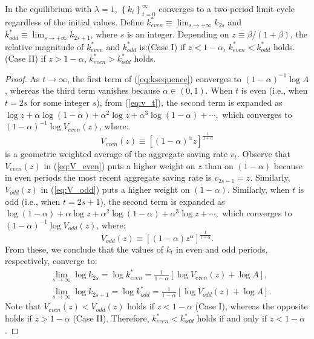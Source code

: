 \documentclass{MBE}%
\begin{document}
{\begin{flLem}
In the equilibrium with $\lambda=1$, $\left\{ k_{t}\right\} _{t=0}^{\infty}$ converges to a
two-period limit cycle regardless of the initial values. Define $k_{even}^{\ast}\equiv\lim
_{s\rightarrow+\infty}k_{2s}$ and $k_{odd}^{\ast}\equiv\lim_{s\rightarrow +\infty}k_{2s+1}$, where
$s$ is an integer. Depending on $z\equiv \beta/(1+\beta)$, the relative magnitude of
$k_{even}^{\ast}$ and
$k_{odd}^{\ast}$ is:\newline\textrm{(Case I)} if $z<1-\alpha$, $k_{even}%
^{\ast}<k_{odd}^{\ast}$ holds.\newline\textrm{(Case II)} if $z>1-\alpha$,
$k_{even}^{\ast}>k_{odd}^{\ast}$ holds. {\label{fn:caseII}}
\end{flLem}

\begin{proof}
As $t\rightarrow\infty$, the first term of (\ref{eq:ksequence}) converges to
$(1-\alpha)^{-1}\log A$, whereas the third term vanishes because $\alpha
\in(0,1)$. When $t$ is even (i.e., when $t=2s$ for some integer $s$), from
(\ref{eq:v_t}), the second term is expanded as $\log z+\alpha\log
(1-\alpha)+\alpha^{2}\log z+\alpha^{3}\log(1-\alpha)+\cdots,$ which converges
to $(1-\alpha)^{-1}\log V_{even}(z)$, where:
\begin{equation}
V_{even}(z)\equiv\left[  \left(  1-\alpha\right)  ^{\alpha}z\right]
^{\frac{1}{1+\alpha}} \label{eq:V_even}%
\end{equation}
is a geometric weighted average of the aggregate saving rate $v_{t}%
$. {Observe that $V_{even}(z)$ in (\ref{eq:V_even}) puts a higher weight on $z$ than on
$(1-\alpha)$ because in even periods the most recent aggregate saving rate is $v_{2s-1}=z$.
Similarly, $V_{odd}(z)$ in (\ref{eq:V_odd}) puts a higher weight on $(1-\alpha)$.} Similarly, when
$t$ is odd (i.e., when $t=2s+1$), the second term is expanded as $\log(1-\alpha )+\alpha\log
z+\alpha^{2}\log(1-\alpha)+\alpha^{3}\log z+\cdots,$ which converges to $(1-\alpha)^{-1}\log
V_{odd}(z)$, where:
\begin{equation}
V_{odd}(z)\equiv\left[  \left(  1-\alpha\right)  z^{\alpha}\right]  ^{\frac
{1}{1+\alpha}}. \label{eq:V_odd}%
\end{equation}
From these, we conclude that the values of $k_{t}$ in even and odd periods,
respectively, converge to:
\begin{align}
&  \lim_{s\rightarrow\infty}\log k_{2s}=\log k_{even}^{\ast}=\frac{1}%
{1-\alpha}\left[  \log V_{even}(z)+\log A\right]  ,\label{eq:Logk*_Even}\\
&  \lim_{s\rightarrow\infty}\log k_{2s+1}=\log k_{odd}^{\ast}=\frac
{1}{1-\alpha}\left[  \log V_{odd}(z)+\log A\right]  . \label{eq:Logk*_Odd}%
\end{align}
Note that $V_{even}(z)<V_{odd}(z)$ holds if $z<1-\alpha$ (Case I), whereas the
opposite holds if $z>1-\alpha$ (Case II). Therefore, $k_{even}^{\ast}%
<k_{odd}^{\ast}$ holds if and only if $z<1-\alpha$.
\end{proof}

}
\end{document}
